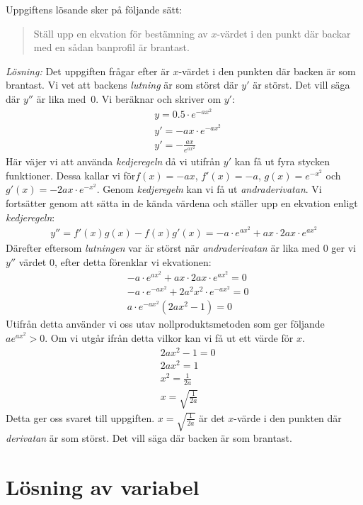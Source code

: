 \documentclass[a4paper,12pt]{article}
\begin{document}
Uppgiftens lösande sker på följande sätt:
%
\begin{quote}
  Ställ upp en ekvation för bestämning av $x$-värdet i den punkt där backar 
  med en sådan banprofil är brantast.
\end{quote}
%
\emph{Lösning:} Det uppgiften frågar efter är $x$-värdet i den punkten där 
backen är som brantast. Vi vet att backens \emph{lutning} är som störst 
där $y'$ är störst. Det vill säga där $y''$ är lika med~0.\newpage
%
Vi beräknar och skriver om $y'$:
%
\begin{align*}
  &y=0.5\cdot e^{-ax^2}\\
  &y'=-ax\cdot e^{-ax^2}\\
  &y'=-\frac{ax}{e^{ax^2}}
\end{align*}
%
Här väjer vi att använda \emph{kedjeregeln} då vi utifrån $y'$ kan få ut 
fyra stycken funktioner. Dessa kallar vi för$f(x)=-ax$, $f'(x)=-a$, $g(x)=e^{-x^2}$ och $g'(x)=-2ax\cdot e^{-x^2}$. 
Genom \emph{kedjeregeln} kan vi få ut \emph{andraderivatan}. Vi fortsätter
genom att sätta in de kända värdena och ställer 
upp en ekvation enligt \emph{kedjeregeln}:
%
\begin{align*}
  \label{eq:1}
  y''=f'(x)g(x)-f(x)g'(x)
  =-a\cdot e^{ax^2}+ax\cdot 2ax\cdot e^{ax^2}
\end{align*}
%
Därefter eftersom \emph{lutningen} var är störst när \emph{andraderivatan}
är lika med 0 ger vi $y''$ värdet 0, efter detta förenklar vi ekvationen:
%
\begin{align*}
  &-a\cdot e^{ax^2}+ax\cdot 2ax\cdot e^{ax^2}=0\\
  &-a\cdot e^{-ax^2}+2a^2x^2\cdot e^{-ax^2}=0\\
  &a\cdot e^{-ax^2}(2ax^2-1)=0
\end{align*}
%
Utifrån detta använder vi oss utav nollproduktsmetoden som ger följande
$ae^{ax^2}>0$. Om vi utgår ifrån detta vilkor kan vi få ut ett värde för 
$x$.
%
\begin{align*}
  &2ax^2-1=0\\
  &2ax^2=1\\
  &x^2=\frac{1}{2a}\\
  &x=\sqrt{\frac{1}{2a}}
\end{align*}
%
Detta ger oss svaret till uppgiften. $x=\sqrt{\frac{1}{2a}}$ är det $x$-värde
i den punkten där \emph{derivatan} är som störst. 
Det vill säga där backen är som brantast.


\section{Lösning av variabel}
\label{sec:uppgN}
\end{document}
